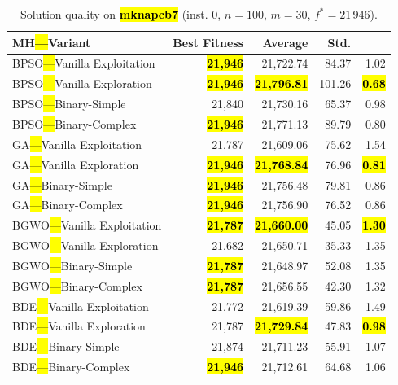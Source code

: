 \documentclass[mathematics,article,accept,moreauthors]{Definitions/mdpi}
\begin{document}
\begin{table}[H]
  \small
  \caption{Solution quality on \textbf{\hl{mknapcb7}} (inst. 0, $n=100$, $m=30$, $f^*=21\,946$).}
  \label{tab:calidad_mknapcb7_0}
  \begin{tabularx}{\textwidth}{lRRRR}
    \toprule
    \textbf{MH\hl{---}Variant} &
    \textbf{Best Fitness} &
    \textbf{Average} &
    \textbf{Std.} &
    \textbf{} \\
    \midrule
    BPSO\hl{---}Vanilla Exploitation & \textbf{\hl{21,946}} &         21,722.74 &  84.37 &         1.02 \\
    BPSO\hl{---}Vanilla Exploration  & \textbf{\hl{21,946}} & \textbf{\hl{21,796.81}} & 101.26 & \textbf{\hl{0.68}} \\
    BPSO\hl{---}Binary-Simple        &          21,840 &         21,730.16 &  65.37 &         0.98 \\
    BPSO\hl{---}Binary-Complex       & \textbf{\hl{21,946}} &         21,771.13 &  89.79 &         0.80 \\
    \midrule
    GA\hl{---}Vanilla Exploitation   &          21,787 &         21,609.06 &  75.62 &         1.54 \\
    GA\hl{---}Vanilla Exploration    & \textbf{\hl{21,946}} & \textbf{\hl{21,768.84}} &  76.96 & \textbf{\hl{0.81}} \\
    GA\hl{---}Binary-Simple          & \textbf{\hl{21,946}} &         21,756.48 &  79.81 &         0.86 \\
    GA\hl{---}Binary-Complex         & \textbf{\hl{21,946}} &         21,756.90 &  76.52 &         0.86 \\
    \midrule
    BGWO\hl{---}Vanilla Exploitation & \textbf{\hl{21,787}} & \textbf{\hl{21,660.00}} &  45.05 & \textbf{\hl{1.30}} \\
    BGWO\hl{---}Vanilla Exploration  &          21,682 &         21,650.71 &  35.33 &         1.35 \\
    BGWO\hl{---}Binary-Simple        & \textbf{\hl{21,787}} &         21,648.97 &  52.08 &         1.35 \\
    BGWO\hl{---}Binary-Complex       & \textbf{\hl{21,787}} &         21,656.55 &  42.30 &         1.32 \\
    \midrule
    BDE\hl{---}Vanilla Exploitation  &          21,772 &         21,619.39 &  59.86 &         1.49 \\
    BDE\hl{---}Vanilla Exploration   &          21,787 & \textbf{\hl{21,729.84}} &  47.83 & \textbf{\hl{0.98}} \\
    BDE\hl{---}Binary-Simple         &          21,874 &         21,711.23 &  55.91 &         1.07 \\
    BDE\hl{---}Binary-Complex        & \textbf{\hl{21,946}} &         21,712.61 &  64.68 &         1.06 \\
    \bottomrule
  \end{tabularx}
\end{table}
\end{document}
